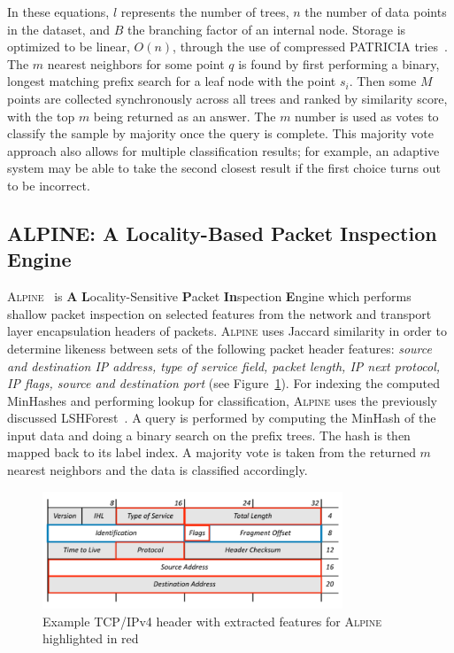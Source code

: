 In these equations, $l$ represents the number of trees, $n$ the number of data points in the dataset, and $B$ the branching factor of an internal node. Storage is optimized to be linear, $O(n)$, through the use of compressed PATRICIA tries~\cite{lshforest}. The $m$ nearest neighbors for some point $q$ is found by first performing a binary, longest matching prefix search for a leaf node with the point $s_i$. Then some $M$ points are collected synchronously across all trees and ranked by similarity score, with the top $m$ being returned as an answer. The $m$ number is used as votes to classify the sample by majority once the query is complete. This majority vote approach also allows for multiple classification results; for example, an adaptive system may be able to take the second closest result if the first choice turns out to be incorrect.

\subsection{ALPINE: A Locality-Based Packet Inspection Engine}
\textsc{Alpine}~\cite{alpinepalm} is \textbf{A} \textbf{L}ocality-Sensitive \textbf{P}acket \textbf{In}spection \textbf{E}ngine which performs shallow packet inspection on selected features from the network and transport layer encapsulation headers of packets. \textsc{Alpine} uses Jaccard similarity in order to determine likeness between sets of the following packet header features: \textit{source and destination IP address, type of service field, packet length, IP next protocol, IP flags, source and destination port} (see Figure~\ref{fig:alpineheader}). For indexing the computed MinHashes and performing lookup for classification, \textsc{Alpine} uses the previously discussed LSHForest~\cite{lshforest}. A query is performed by computing the MinHash of the input data and doing a binary search on the prefix trees. The hash is then mapped back to its label index. A majority vote is taken from the returned $m$ nearest neighbors and the data is classified accordingly.

\begin{figure} [ht!]
  \centering
  \includegraphics[width=0.8\textwidth]{chapters/4/img/alpineheader.png}
  \caption{Example TCP/IPv4 header with extracted features for \textsc{Alpine} highlighted in red}
  \label{fig:alpineheader}
\end{figure}

